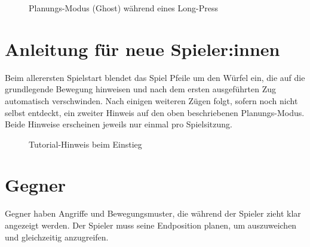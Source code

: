 \documentclass[oneside]{ausarbeitung}
\begin{document}
\begin{figure}[h]
    \centering
    \caption{Planungs-Modus (Ghost) während eines Long-Press}
    \label{fig:ghost-modus}
\end{figure}

\section{Anleitung für neue Spieler:innen}
Beim allerersten Spielstart blendet das Spiel Pfeile um
den Würfel ein, die auf die grundlegende Bewegung hinweisen und nach dem ersten ausgeführten Zug
automatisch verschwinden. Nach einigen weiteren Zügen folgt, sofern noch nicht selbst entdeckt, ein
zweiter Hinweis auf den oben beschriebenen Planungs-Modus. Beide Hinweise erscheinen jeweils nur
einmal pro Spielsitzung.

\begin{figure}[h]
    \centering
    \caption{Tutorial-Hinweis beim Einstieg}
    \label{fig:tutorial}
\end{figure}


\section{Gegner}
Gegner haben Angriffe und Bewegungsmuster, die während der Spieler zieht klar angezeigt werden. Der Spieler muss seine Endposition planen, um auszuweichen und gleichzeitig anzugreifen.
\end{document}
